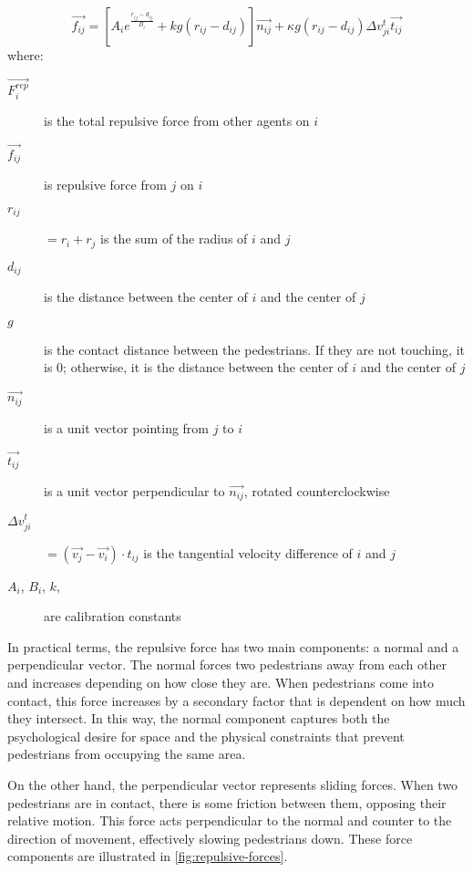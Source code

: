 \documentclass[twoside, 11pt]{article}
\begin{document}
\begin{equation}
  \vec{f_{ij}} = [A_ie^{\frac{r_{ij} - d_{ij}}{B_i}} + kg(r_{ij}-d_{ij})]\vec{n_{ij}} + \kappa g (r_{ij} - d_{ij})\Delta v_{ji}^t \vec{t_{ij}}
  \label{eq:pedestrian_repulsion}
\end{equation}
where:
\begin{description}
  \item[$\vec{F_i^{rep}}$] is the total repulsive force from other agents on $i$
  \item[$\vec{f_{ij}}$] is repulsive force from $j$ on $i$
  
  \item[$r_{ij}$] $= r_i + r_j$ is the sum of the radius of $i$ and $j$
  \item[$d_{ij}$] is the distance between the center of $i$ and the center of $j$
  \item[$g$] is the contact distance between the pedestrians. If they are not touching, it is $0$; otherwise, it is the distance between the center of $i$ and the center of $j$
  \item[$\vec{n_{ij}}$] is a unit vector pointing from $j$ to $i$
  \item[$\vec{t_{ij}}$] is a unit vector perpendicular to $\vec{n_{ij}}$, rotated counterclockwise
  \item[$\Delta v_{ji}^t$] $= (\vec{v_j} - \vec{v_i}) \cdot t_{ij}$ is the tangential velocity difference of $i$ and $j$
  \item[$A_i$, $B_i$, $k$, \kappa] are calibration constants
\end{description}

In practical terms, the repulsive force has two main components: a normal and a perpendicular vector. The normal forces two pedestrians away from each other and increases depending on how close they are. When pedestrians come into contact, this force increases by a secondary factor that is dependent on how much they intersect. In this way, the normal component captures both the psychological desire for space and the physical constraints that prevent pedestrians from occupying the same area. 

On the other hand, the perpendicular vector represents sliding forces. When two pedestrians are in contact, there is some friction between them, opposing their relative motion. This force acts perpendicular to the normal and counter to the direction of movement, effectively slowing pedestrians down. These force components are illustrated in \autoref{fig:repulsive-forces}.
\end{document}
